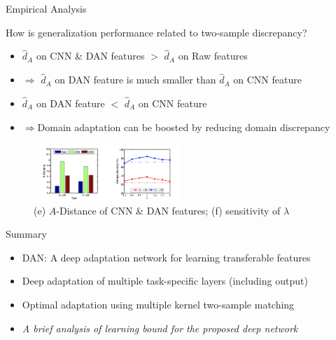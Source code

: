 \documentclass{beamer}
\begin{document}
\begin{frame}[fragile]{Empirical Analysis}
\begin{block}{How is generalization performance related to two-sample discrepancy?}
\begin{itemize}
\item{$\hat{d}_A$ on CNN \& DAN features $>$ $\hat{d}_A$ on Raw features}
\item{$\Rightarrow$ $\hat{d}_A$ on DAN feature is much smaller than $\hat{d}_A$ on CNN feature}
\item{$\hat{d}_A$ on DAN feature $<$ $\hat{d}_A$ on CNN feature}
\item{$\Rightarrow$Domain adaptation can be boosted by reducing domain discrepancy}
\end{itemize}
\end{block}
\begin{figure}[h]
    \centering
    \includegraphics[width=0.5\textwidth]{fig6}
    \caption{ (e) $A$-Distance of CNN \& DAN features; (f) sensitivity of $\lambda$}
    \label{fig:mesh2}
\end{figure}
\end{frame}

\begin{frame}[fragile]{Summary}
\begin{itemize}
\item{DAN: A deep adaptation network for learning transferable features}
\item{Deep adaptation of multiple task-specific layers (including output)}
\item{Optimal adaptation using multiple kernel two-sample matching}
\item{\emph{A brief analysis of learning bound for the proposed deep network}}
\end{itemize}
\end{frame}
\end{document}
